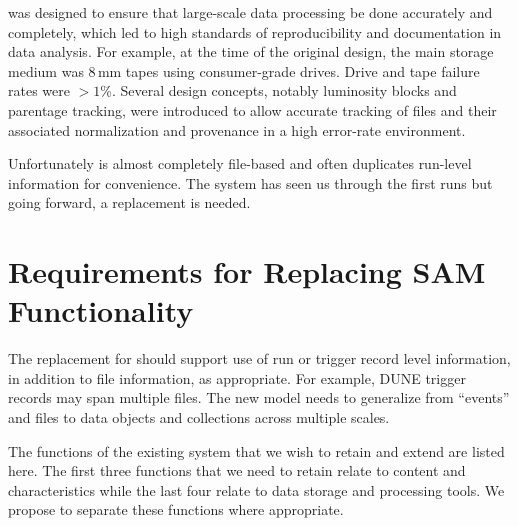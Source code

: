\documentclass[../main-v1.tex]{subfiles}
\begin{document}
 was designed to ensure that large-scale data processing be done accurately and completely,  which led to  high standards of reproducibility and documentation in data analysis.
For example, at the time of the original design, the main storage medium was 8\,mm tapes using consumer-grade drives.  Drive and tape failure rates were $>1$\%.  Several  design concepts, notably luminosity blocks and parentage tracking, were introduced to allow accurate tracking of files and their associated normalization and provenance in a high error-rate environment. 

Unfortunately  is almost completely file-based and often duplicates run-level information for convenience.  The %
system has seen us through the first  runs but going forward, a replacement is needed. %

\section{Requirements for Replacing SAM Functionality }




 The replacement for  should support use of run or trigger record level information, in addition to file information,  as appropriate. 
For example,  DUNE trigger records may span multiple files. The new model needs to generalize from ``events'' and files to data objects and collections across multiple scales. 

The functions of the existing  system that we wish to retain and extend are listed here. The first three functions that we need to retain %
relate to content and characteristics while the last four relate to data storage and processing tools.  We propose to separate these functions where appropriate.
\end{document}
